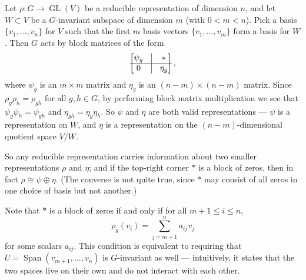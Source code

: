 Let $\rho : G \to \operatorname{GL}(V)$ be a reducible representation of dimension $n$, and let $W \subset V$ be a $G$-invariant subspace of dimension $m$ (with $0 < m < n$). Pick a basis $\{v_1, \ldots, v_n\}$ for $V$ such that the first $m$ basis vectors $\{v_1, \ldots, v_m\}$ form a basis for $W$. Then $G$ acts by block matrices of the form \[\begin{bmatrix} \psi_g & \vline & * \\ \hline 0 & \vline &  \eta_g\end{bmatrix},\] where $\psi_g$ is an $m \times m$ matrix and $\eta_g$ is an $(n - m) \times (n - m)$ matrix. Since $\rho_g\rho_h = \rho_{gh}$ for all $g, h \in G$, by performing block matrix multiplication we see that $\psi_g\psi_h = \psi_{gh}$ and $\eta_{gh} = \eta_g\eta_h$. So $\psi$ and $\eta$ are both valid representations --- $\psi$ is a representation on $W$, and $\eta$ is a representation on the $(n - m)$-dimensional quotient space $V/W$. 



So any reducible representation carries information about two smaller representations $\rho$ and $\eta$; and if the top-right corner $*$ is a block of zeros, then in fact $\rho \cong \psi \oplus \eta$. (The converse is not quite true, since $*$ may consist of all zeros in one choice of basis but not another.) 





Note that $*$ is a block of zeros if and only if for all $m + 1 \leq i \leq n$,  \[\rho_g(v_i) = \sum_{j = m + 1}^n a_{ij} v_j\] for some scalars $a_{ij}$. This condition is equivalent to requiring that $U = \operatorname{Span}(v_{m + 1}, \ldots, v_n)$ is $G$-invariant as well --- intuitively, it states that the two spaces live on their own and do not interact with each other.

